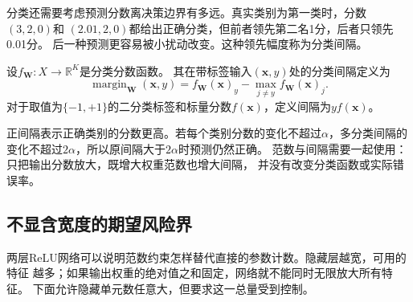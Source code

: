分类还需要考虑预测分数离决策边界有多远。真实类别为第一类时，分数$(3,2,0)$和
$(2.01,2,0)$都给出正确分类，但前者领先第二名1分，后者只领先0.01分。
后一种预测更容易被小扰动改变。这种领先幅度称为分类间隔。

\begin{definition}[分类间隔]
\label{def:network-margin}
设$f_{\bm W}:X\to\mathbb R^K$是分类分数函数。
其在带标签输入$(\bm x,y)$处的分类间隔定义为
\begin{equation}
 \operatorname{margin}_{\bm W}(\bm x,y)
 =f_{\bm W}(\bm x)_y-\max_{j\neq y}f_{\bm W}(\bm x)_j.
 \label{eq:network-margin}
\end{equation}
对于取值为$\{-1,+1\}$的二分类标签和标量分数$f(\bm x)$，定义间隔为$yf(\bm x)$。
\end{definition}

正间隔表示正确类别的分数更高。若每个类别分数的变化不超过$\alpha$，多分类间隔的
变化不超过$2\alpha$，所以原间隔大于$2\alpha$时预测仍然正确。
范数与间隔需要一起使用：只把输出分数放大，既增大权重范数也增大间隔，
并没有改变分类函数或实际错误率。

\subsection{不显含宽度的期望风险界}

两层ReLU网络可以说明范数约束怎样替代直接的参数计数。隐藏层越宽，可用的特征
越多；如果输出权重的绝对值之和固定，网络就不能同时无限放大所有特征。
下面允许隐藏单元数任意大，但要求这一总量受到控制。

